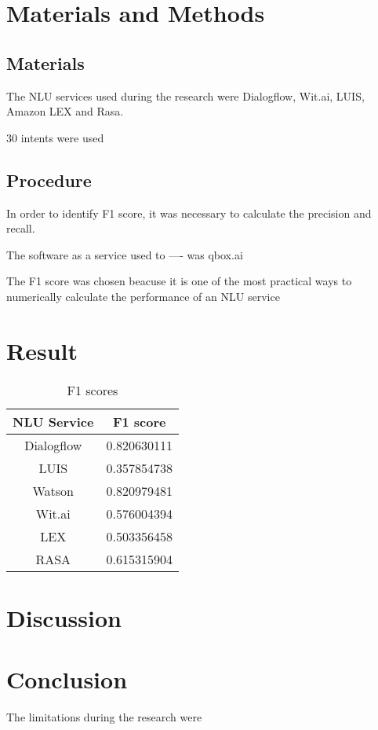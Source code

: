 \documentclass[conference]{IEEEtran}
\begin{document}
\section{Materials and Methods}
\subsection{Materials}
The NLU services used during the research were Dialogflow, Wit.ai, LUIS, Amazon LEX and Rasa.

30 intents were used

\subsection{Procedure}
In order to identify F1 score, it was necessary to calculate the precision and recall.

The software as a service used to ---- was qbox.ai

The F1 score was chosen beacuse it is one of the most practical ways to numerically calculate the performance of an NLU service

\section{Result}
\begin{table}[htbp]
    \centering
    \caption{F1 scores}
    \begin{tabular}{|c|c|}
        \hline
        NLU Service & F1 score    \\
        \hline
        Dialogflow  & 0.820630111 \\
        \hline
        LUIS        & 0.357854738 \\
        \hline
        Watson      & 0.820979481 \\
        \hline
        Wit.ai      & 0.576004394 \\
        \hline
        LEX         & 0.503356458 \\
        \hline
        RASA        & 0.615315904 \\
        \hline
    \end{tabular}%
    \label{tab:addlabel}%
\end{table}%
\section{Discussion}
\section{Conclusion}
The limitations during the research were
\end{document}
